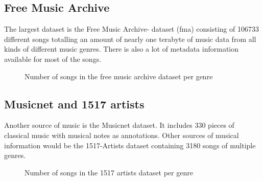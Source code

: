 \subsection{Free Music Archive}

The largest dataset is the Free Music Archive- dataset (fma) consisting of 106733 different songs totalling an amount of nearly one terabyte of music data from all kinds of different music genres.\cite{fma1} There is also a lot of metadata information available for most of the songs.

\begin{figure}[thpb]
	\centering
	\caption{Number of songs in the free music archive dataset per genre}
	\label{fmadist}
\end{figure}
\FloatBarrier

\subsection{Musicnet and 1517 artists}

Another source of music is the Musicnet dataset.\cite{musicnet1} It includes 330 pieces of classical music with musical notes as annotations. 
Other sources of musical information would be the 1517-Artists dataset containing 3180 songs of multiple genres. \cite{1517artists1}

\begin{figure}[thpb]
	\centering
	\caption{Number of songs in the 1517 artists dataset per genre}
	\label{1517dist}
\end{figure}
\FloatBarrier

